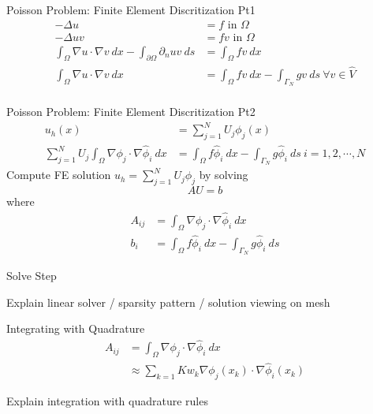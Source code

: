 \begin{frame}{Poisson Problem: Finite Element Discritization Pt1}
  \begin{align*}
    -\Delta u &= f \text{ in } \Omega \\
    -\Delta u v &= f v \text { in } \Omega \\
    \int_{\Omega} \nabla u \cdot \nabla v \ dx
    - \int_{\partial \Omega} \partial_n u v \ ds 
                &= \int_{\Omega} f v \ dx \\
   \int_{\Omega} \nabla u \cdot \nabla v \ dx
                &= \int_{\Omega} f v \ dx 
                - \int_{\Gamma_N} g v \ ds \ \forall v \in \hat{V}\\
  \end{align*}
\end{frame}

\begin{frame}{Poisson Problem: Finite Element Discritization Pt2}
  \begin{align*}
    u_h(x) &= \sum^N_{j = 1} U_j \phi_j(x) \\
    \sum^N_{j = 1} U_j \int_{\Omega} \nabla \phi_j \cdot \nabla \hat{\phi}_i \ dx &= \int_{\Omega} f \hat{\phi}_i \ dx - \int_{\Gamma_N} g \hat{\phi}_i \ ds \ i = 1, 2, \cdots, N
  \end{align*}
  Compute FE solution $u_h = \sum^N_{j = 1} U_j \phi_j$ by solving
  $$AU = b$$
  where
\begin{align*}
  A_{ij} &= \int_{\Omega} \nabla \phi_j \cdot \nabla \hat{\phi}_i \ dx \\
  b_i &= \int_{\Omega} f \hat{\phi}_i \ dx - \int_{\Gamma_N} g \hat{\phi}_i \ ds 
\end{align*}
\end{frame}

\begin{frame}{Solve Step}
  \begin{outline}
    \1 Explain linear solver / sparsity pattern / solution viewing on mesh
  \end{outline}
\end{frame}

\begin{frame}{Integrating with Quadrature}
\begin{align*}
  A_{ij} &= \int_{\Omega} \nabla \phi_j \cdot \nabla \hat{\phi}_i \ dx \\
         &\approx \sum_{k = 1}{K} w_k \nabla \phi_j(x_k) \cdot \nabla \hat{\phi}_i (x_k)
\end{align*}
\begin{outline}
  \1 Explain integration with quadrature rules 
\end{outline}
\end{frame}

